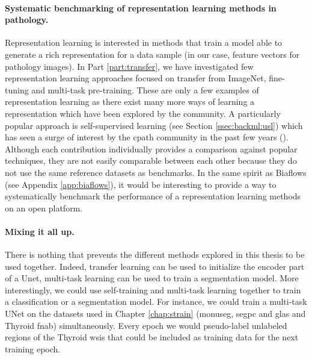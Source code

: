 \paragraph{Systematic benchmarking of representation learning methods in pathology.} Representation learning is interested in methods that train a model able to generate a rich representation for a data sample (\eg in our case, feature vectors for pathology images). In Part \ref{part:transfer}, we have investigated few representation learning approaches focused on transfer from ImageNet, fine-tuning and multi-task pre-training. These are only a few examples of representation learning as there exist many more ways of learning a representation which have been explored by the community. A particularly popular approach is self-supervised learning (see Section \ref{ssec:backml:usl}) which has seen a surge of interest by the \acrlong{cpath} community in the past few years (\eg \cite{xie2020instance, wang2021transpath, boyd2021self, koohbanani2021self, chen2022self}). Although each contribution individually provides a comparison against popular techniques, they are not easily comparable between each other because they do not use the same reference datasets as benchmarks. In the same spirit as Biaflows \cite{rubens2020biaflows} (see Appendix \ref{app:biaflows}), it would be interesting to provide a way to systematically benchmark the performance of a representation learning methods on an open platform.

\paragraph{Mixing it all up.} There is nothing that prevents the different methods explored in this thesis to be used together. Indeed, transfer learning can be used to initialize the encoder part of a Unet, multi-task learning can be used to train a segmentation model. More interestingly, we could use self-training and multi-task learning together to train a classification or a segmentation model. For instance, we could train a multi-task UNet on the datasets used in Chapter \ref{chap:strain} (\acrshort{monuseg}, \acrshort{segpc} and \acrshort{glas} and Thyroid \acrshort{fnab}) simultaneously. Every epoch we would pseudo-label unlabeled regions of the Thyroid \acrlong{wsi}s that could be included as training data for the next training epoch.
